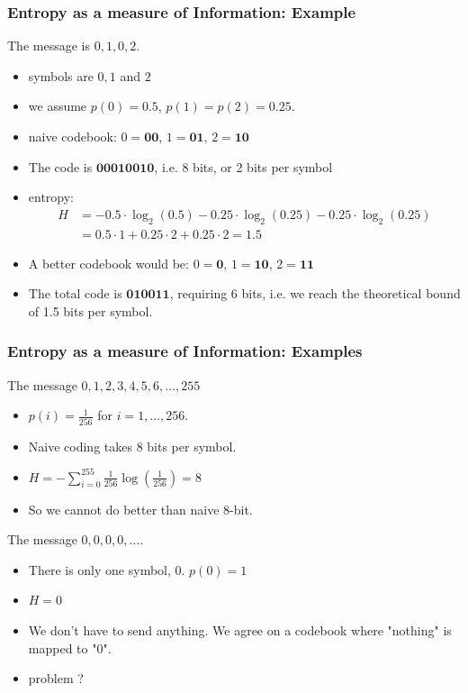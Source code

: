 \documentclass{beamer}
\begin{document}
\begin{frame}
\frametitle{Entropy as a measure of Information: Example}
The message is $0,1,0,2$. 

\begin{itemize}
\item symbols are $0,1$ and $2$ 
\item we assume $p(0)=0.5$, $p(1)=p(2)=0.25$. 
\item naive codebook: $0=\mathbf{00}$, $1=\mathbf{01}$, $2=\mathbf{10}$
\item The code is $\mathbf{00010010}$, i.e. 8 bits, or 2 bits per symbol

\item entropy: 
\begin{align*}H &= -0.5\cdot\log_2(0.5) - 0.25\cdot \log_2(0.25) - 0.25\cdot \log_2(0.25) 
\\
&= 0.5\cdot 1 + 0.25\cdot 2 + 0.25\cdot 2 = 1.5
\end{align*}

\item A better codebook would be: $0=\mathbf{0}$, $1=\mathbf{10}$, $2=\mathbf{11}$

\item The total code is $\mathbf{010011}$, requiring $6$ bits, i.e. we reach the 
theoretical bound of 1.5 bits per symbol.
\end{itemize}
\end{frame}

\begin{frame}
\frametitle{Entropy as a measure of Information: Examples}
The message $0,1,2,3,4,5,6,\dots,255$
\begin{itemize}
\item $p(i)=\frac{1}{256}$ for $i=1,\dots,256$.
\item Naive coding takes 8 bits per symbol.
\item $H = -\sum_{i=0}^{255} \frac{1}{256} \log(\frac{1}{256}) = 8$
\item So we cannot do better than naive 8-bit. 
\end{itemize}

The message $0,0,0,0,\dots$.

\begin{itemize}
\item There is only one symbol, $0$. $p(0)=1$
\item $H = 0$
\item We don't have to send anything. We agree on a codebook where "nothing" is mapped to "0". 
\item problem ?
\end{itemize}

\end{frame}
\end{document}

